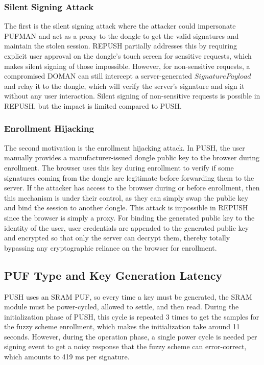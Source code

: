 \subsubsection{Silent Signing Attack}
The first is the silent signing attack where the attacker could impersonate PUFMAN and act as a proxy to the dongle to get the valid signatures and maintain the stolen session. REPUSH partially addresses this by requiring explicit user approval on the dongle's touch screen for sensitive requests, which makes silent signing of those impossible. However, for non-sensitive requests, a compromised DOMAN can still intercept a server-generated $SignaturePayload$ and relay it to the dongle, which will verify the server's signature and sign it without any user interaction. Silent signing of non-sensitive requests is possible in REPUSH, but the impact is limited compared to PUSH. 

\subsubsection{Enrollment Hijacking}
The second motivation is the enrollment hijacking attack. In PUSH, the user manually provides a manufacturer-issued dongle public key to the browser during enrollment. The browser uses this key during enrollment to verify if some signatures coming from the dongle are legitimate before forwarding them to the server. If the attacker has access to the browser during or before enrollment, then this mechanism is under their control, as they can simply swap the public key and bind the session to another dongle. This attack is impossible in REPUSH since the browser is simply a proxy. For binding the generated public key to the identity of the user, user credentials are appended to the generated public key and encrypted so that only the server can decrypt them, thereby totally bypassing any cryptographic reliance on the browser for enrollment. 

\subsection{PUF Type and Key Generation Latency}
PUSH uses an SRAM PUF, so every time a key must be generated, the SRAM module must be power-cycled, allowed to settle, and then read. During the initialization phase of PUSH, this cycle is repeated 3 times to get the samples for the fuzzy scheme enrollment, which makes the initialization take around 11 seconds. However, during the operation phase, a single power cycle is needed per signing event to get a noisy response that the fuzzy scheme can error-correct, which amounts to 419 ms per signature.

